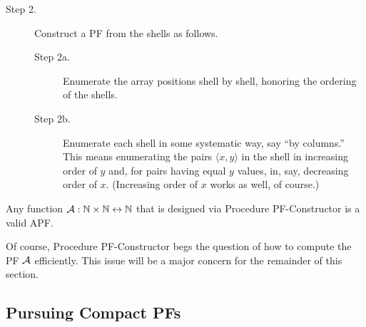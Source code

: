 \begin{description}
\item[Step 2.]
Construct a PF from the shells as follows.
  \begin{description}
  \item[Step 2a.]
Enumerate the array positions shell by shell, honoring the ordering of
the shells.
  \item[Step 2b.]
Enumerate each shell in some systematic way, say ``by columns.''  This
means enumerating the pairs $\langle x,y \rangle$ in the shell in
increasing order of $y$ and, for pairs having equal $y$ values, in,
say, decreasing order of $x$.  (Increasing order of $x$ works as
well, of course.)
  \end{description}
\end{description}

\begin{theorem}
Any function $\mbox{$\cal A$}: \mathbb{N} \times \mathbb{N} \leftrightarrow \mathbb{N}$ that is designed
via Procedure {\sf PF-Constructor} is a valid APF.
\end{theorem}


Of course, Procedure {\sf PF-Constructor} begs the question of how to
compute the PF $\mbox{$\cal A$}$ efficiently.  This issue will be a major concern
for the remainder of this section.

\subsection{Pursuing Compact PFs}

